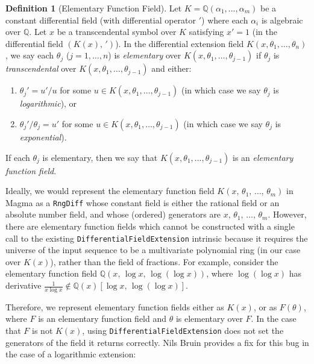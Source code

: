 \documentclass{article}
\theoremstyle{plain}
\theoremstyle{definition}
\newtheorem{definition}{Definition}
\newcommand{\Q}{\mathbb{Q}}
\begin{document}
\begin{definition}[Elementary Function Field] \label{elementary_field}
    Let $K = \mathbb{Q}(\alpha_1, \dots, \alpha_m)$ be a constant differential
    field (with differential operator $'$) where each $\alpha_i$ is algebraic
    over $\mathbb{Q}$. Let $x$ be a transcendental symbol over $K$ satisfying
    $x' = 1$ (in the differential field $(K(x),\, ')$). In the differential
    extension field $K(x, \theta_1, \dots, \theta_n)$, we say each $\theta_j$
    ($j = 1, \dots, n$) is \emph{elementary} over $K(x, \theta_1, \dots,
    \theta_{j - 1})$ if $\theta_j$ is \emph{transcendental} over $K(x, \theta_1,
    \dots, \theta_{j - 1})$ and either:
    \begin{enumerate}[label=(\roman*)]
        \item $\theta_j' = u'/u$ for some $u \in K(x, \theta_1, \dots,
            \theta_{j - 1})$ (in which case we say $\theta_j$ is
            \emph{logarithmic}), or
        \item $\theta_j'/\theta_j = u'$ for some $u \in K(x, \theta_1, \dots,
            \theta_{j - 1})$ (in which case we say $\theta_j$ is
            \emph{exponential}).
    \end{enumerate}
    If each $\theta_j$ is elementary, then we say that $K(x, \theta_1, \dots,
    \theta_{j - 1})$ is an \emph{elementary function field}.
\end{definition}

Ideally, we would represent the elementary function field $K(x,\, \theta_1,\,
\dots,\, \theta_m)$ in Magma as a \lstinline{RngDiff} whose constant field is
either the rational field or an absolute number field, and whose (ordered)
generators are $x,\, \theta_1,\, \dots,\, \theta_m$. However, there are
elementary function fields which cannot be constructed with a single call to the
existing \lstinline{DifferentialFieldExtension} intrinsic because it requires
the universe of the input sequence to be a multivariate polynomial ring (in our
case over $K(x)$), rather than the field of fractions. For example, consider the
elementary function field $\Q(x,\, \log x,\, \log(\log x))$, where
$\log(\log x)$ has derivative $\frac 1 {x \log x} \not \in \Q(x)[\log x,\,
\log(\log x)]$. \medbreak

Therefore, we represent elementary function fields either as $K(x)$, or as
$F(\theta)$, where $F$ is an elementary function field and $\theta$ is
elementary over $F$. In the case that $F$ is not $K(x)$, using
\lstinline{DifferentialFieldExtension} does not set the generators of the field
it returns correctly. Nils Bruin provides a fix for this bug in the case of a
logarithmic extension:
\end{document}
